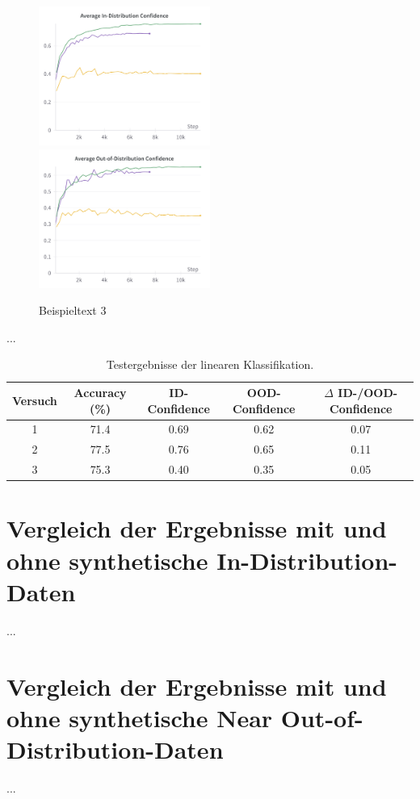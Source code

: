 \begin{figure}
	\centering
	\includegraphics[width=0.5\textwidth]{figure_results_supcon-lin_avg-id-conf.png}%
	\includegraphics[width=0.5\textwidth]{figure_results_supcon-lin_avg-ood-conf.png}
	\caption{Beispieltext 3}
\end{figure}

...

\begin{table}
	\centering
	\begin{tabular}{|c|c|c|c|c|}
		\hline
		\textbf{Versuch} & \textbf{Accuracy (\%)} & \textbf{ID-Confidence} & \textbf{OOD-Confidence} & \textbf{$\Delta$ ID-/OOD-Confidence} \\
		\hline
		1 & 71.4 & 0.69 & 0.62 & 0.07 \\
		2 & 77.5 & 0.76 & 0.65 & 0.11 \\
		3 & 75.3 & 0.40 & 0.35 & 0.05 \\
		\hline
	\end{tabular}
	\caption{Testergebnisse der linearen Klassifikation.}
\end{table}

\section{Vergleich der Ergebnisse mit und ohne synthetische In-Distribution-Daten}

...

\section{Vergleich der Ergebnisse mit und ohne synthetische Near Out-of-Distribution-Daten}

...
